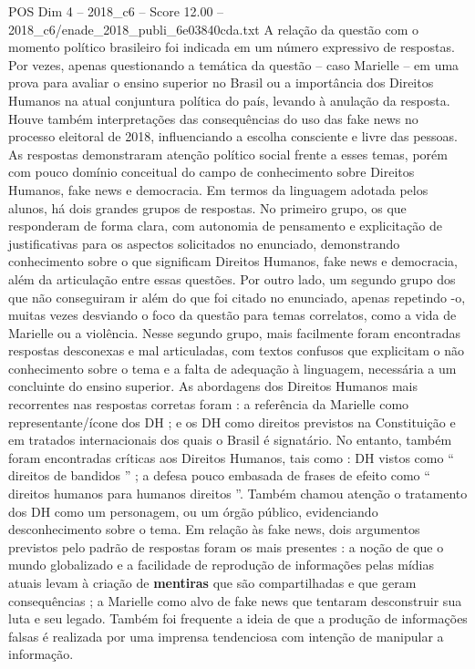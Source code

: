 \begin{textsample}{POS Dim 4 – 2018\_c6 – Score 12.00 – 2018\_c6/enade\_2018\_publi\_6e03840cda.txt}
A relação da questão com o momento político brasileiro foi indicada em um número expressivo de respostas.
Por vezes, apenas questionando a temática da questão – caso Marielle – em uma prova para avaliar o ensino superior no Brasil ou a importância dos Direitos Humanos na atual conjuntura política do país, levando à anulação da resposta.
Houve também interpretações das consequências do uso das fake news no processo eleitoral de 2018, influenciando a escolha consciente e livre das pessoas.
As respostas demonstraram atenção político social frente a esses temas, porém com pouco domínio conceitual do campo de conhecimento sobre Direitos Humanos, fake news e democracia.
Em termos da linguagem adotada pelos alunos, há dois grandes grupos de respostas.
No primeiro grupo, os que responderam de forma clara, com autonomia de pensamento e explicitação de justificativas para os aspectos solicitados no enunciado, demonstrando conhecimento sobre o que significam Direitos Humanos, fake news e democracia, além da articulação entre essas questões.
Por outro lado, um segundo grupo dos que não conseguiram ir além do que foi citado no enunciado, apenas repetindo -o, muitas vezes desviando o foco da questão para temas correlatos, como a vida de Marielle ou a violência.
Nesse segundo grupo, mais facilmente foram encontradas respostas desconexas e mal articuladas, com textos confusos que explicitam o não conhecimento sobre o tema e a falta de adequação à linguagem, necessária a um concluinte do ensino superior.
As abordagens dos Direitos Humanos mais recorrentes nas respostas corretas foram : a referência da Marielle como representante/ícone dos DH ; e os DH como direitos previstos na Constituição e em tratados internacionais dos quais o Brasil é signatário.
No entanto, também foram encontradas críticas aos Direitos Humanos, tais como : DH vistos como “ direitos de bandidos ” ; a defesa pouco embasada de frases de efeito como “ direitos humanos para humanos direitos ”.
Também chamou atenção o tratamento dos DH como um personagem, ou um órgão público, evidenciando desconhecimento sobre o tema.
Em relação às fake news, dois argumentos previstos pelo padrão de respostas foram os mais presentes : a noção de que o mundo globalizado e a facilidade de reprodução de informações pelas mídias atuais levam à criação de \textbf{mentiras} que são compartilhadas e que geram consequências ; a Marielle como alvo de fake news que tentaram desconstruir sua luta e seu legado.
Também foi frequente a ideia de que a produção de informações falsas é realizada por uma imprensa tendenciosa com intenção de manipular a informação.

\end{textsample}
